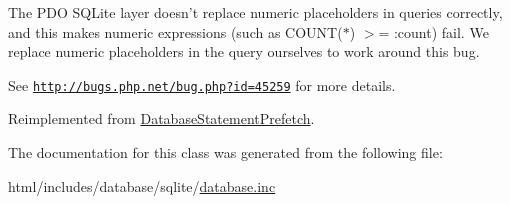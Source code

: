 The PDO SQLite layer doesn't replace numeric placeholders in queries correctly, and this makes numeric expressions (such as COUNT($\ast$) $>$= :count) fail. We replace numeric placeholders in the query ourselves to work around this bug.

See \href{http://bugs.php.net/bug.php?id=45259}{\tt http://bugs.php.net/bug.php?id=45259} for more details. 

Reimplemented from \hyperlink{classDatabaseStatementPrefetch_a08ef92c5108225cdd2e02885ca2aeea4}{DatabaseStatementPrefetch}.

The documentation for this class was generated from the following file:\begin{DoxyCompactItemize}
\item 
html/includes/database/sqlite/\hyperlink{sqlite_2database_8inc}{database.inc}\end{DoxyCompactItemize}
